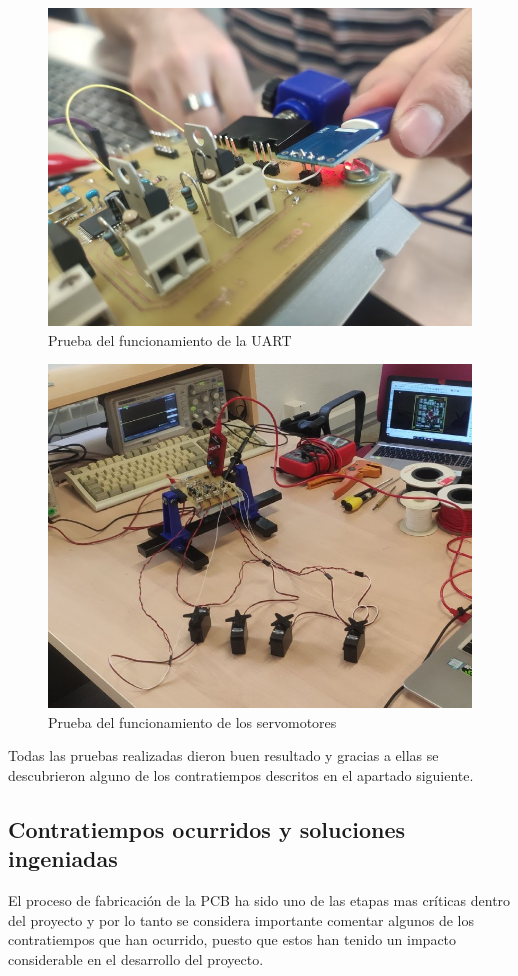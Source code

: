 \begin{itemize}
    \begin{figure}[H]
    \centering 
    \includegraphics[width=0.55\linewidth]{pictures/PruebaUart}
    \caption{Prueba del funcionamiento de la UART}
    \label{fig:kdiagram}
    \end{figure}
    
    \begin{figure}[H]
    \centering 
    \includegraphics[width=0.55\linewidth]{pictures/PruebaServos.jpg}
    \caption{Prueba del funcionamiento de los servomotores}
    \label{fig:kdiagram}
    \end{figure}
    
\end{itemize}

Todas las pruebas realizadas dieron buen resultado y gracias a ellas se descubrieron alguno de los contratiempos descritos en el apartado siguiente.

\subsection{Contratiempos ocurridos y soluciones ingeniadas}

El proceso de fabricación de la \ac{PCB} ha sido uno de las etapas mas críticas dentro del proyecto y por lo tanto se considera importante comentar algunos de los contratiempos que han ocurrido, puesto que estos han tenido un impacto considerable en el desarrollo del proyecto.

